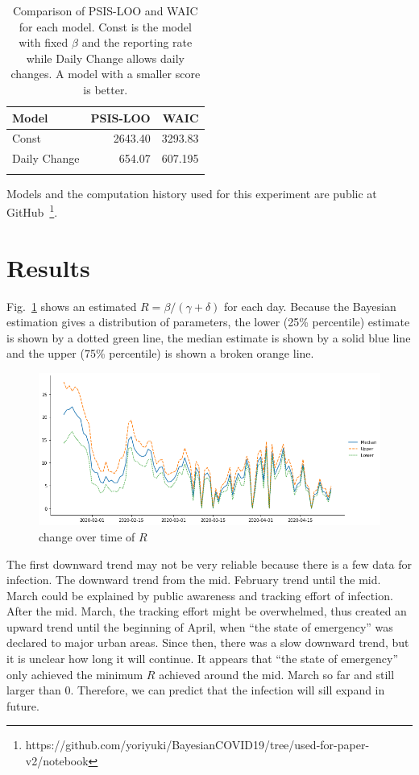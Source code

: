 \documentclass{amsart}
\begin{document}
\begin{table}[h]
\begin{center}
\begin{tabular}{lrr} \toprule
Model & PSIS-LOO & WAIC \\ \midrule 
Const & 2643.40 &  3293.83 \\ 
Daily Change & 654.07 & 607.195 \\
\bottomrule\\
\end{tabular}
\caption{Comparison of PSIS-LOO and WAIC for each model.  Const is the model with fixed $\beta$ and the reporting rate while Daily Change allows daily changes.  A model with a smaller score is better.}
\label{tbl:IC}
\end{center}
\end{table}

Models and the computation history used for this experiment are public at GitHub~\footnote{https://github.com/yoriyuki/BayesianCOVID19/tree/used-for-paper-v2/notebook}.

\section{Results}

Fig.~\ref{fig:b} shows an estimated $R = \beta/(\gamma+\delta)$ for each day.
Because the Bayesian estimation gives a distribution of parameters, the lower (25\% percentile) estimate is shown by a dotted green line, the median estimate is shown by a solid blue line and the upper (75\% percentile) is shown a broken orange line.
\begin{figure}[h]
 \centering
 \includegraphics[width=\linewidth]{fig/R0-Japan.png}
 \caption{ change over time of $R$}
 \label{fig:b}
\end{figure}
The first downward trend may not be very reliable because there is a few data for infection.
The downward trend from the mid. February trend until the mid. March could be explained by public awareness and tracking effort of infection.
After the mid. March, the tracking effort might be overwhelmed, thus created an upward trend until the beginning of April, when ``the state of emergency'' was declared to major urban areas.
Since then, there was a slow downward trend, but it is unclear how long it will continue.
It appears that ``the state of emergency'' only achieved the minimum $R$ achieved around the mid. March so far and still larger than 0.
Therefore, we can predict that the infection will sill expand in future.
\end{document}
